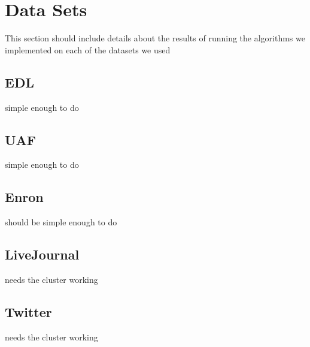 \section{Data Sets}
This section should include details about the results of running the algorithms we implemented on each of the datasets we used

\subsection{EDL}
simple enough to do

\subsection{UAF}
simple enough to do

\subsection{Enron}
should be simple enough to do

\subsection{LiveJournal}
needs the cluster working

\subsection{Twitter}
needs the cluster working